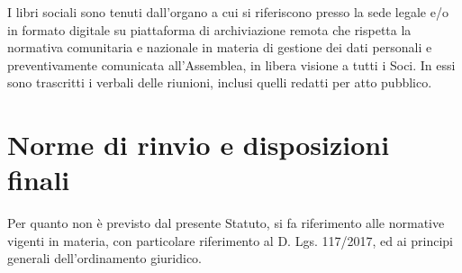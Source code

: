 \documentclass[legalpaper, 11pt]{exam}
\let\tempone\enumerate
\let\temptwo\endenumerate
\renewenvironment{enumerate}{\tempone\addtolength{\itemsep}{-0.45\baselineskip}}{\temptwo}
\begin{document}
{\begin{enumerate}
 \item I libri sociali sono tenuti dall’organo a cui si riferiscono presso la sede legale e/o in formato digitale su piattaforma di archiviazione remota che rispetta la normativa comunitaria e nazionale in materia di gestione dei dati personali e preventivamente comunicata all’Assemblea, in libera visione a tutti i Soci. In essi sono trascritti i verbali delle riunioni, inclusi quelli redatti per atto pubblico.
\end{enumerate}

\section{Norme di rinvio e disposizioni finali}
\begin{enumerate}
 \item Per quanto non è previsto dal presente Statuto, si fa riferimento alle normative vigenti in materia, con particolare riferimento al D. Lgs. 117/2017, ed ai principi generali dell’ordinamento giuridico.
\end{enumerate}
}
\end{document}
